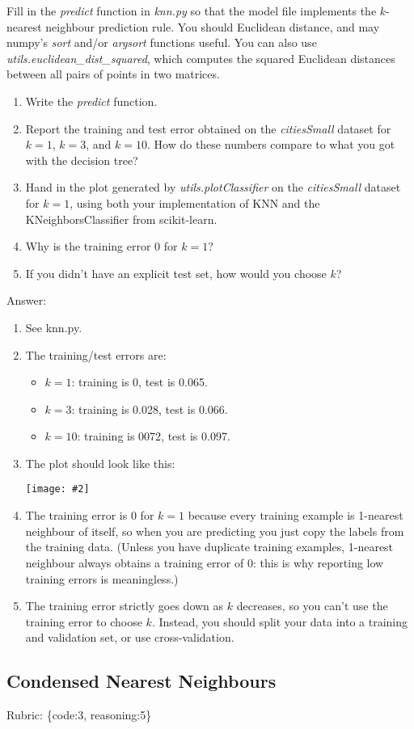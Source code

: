 \documentclass{article}
\def\ans#1{\par\gre{Answer: #1}}
\def\answer#1{\ans{#1}}
\def\rubric#1{\gre{Rubric: \{#1\}}}{}
\def\blu#1{{\color{blu}#1}}
\def\gre#1{{\color{gre}#1}}
\newcommand{\centerfig}[2]{\begin{center}\texttt{[image: \#2]}\end{center}}
\def\items#1{\begin{itemize}#1\end{itemize}}
\def\enum#1{\begin{enumerate}#1\end{enumerate}}
\begin{document}
Fill in the \emph{predict} function in \emph{knn.py} so that the model file implements the $k$-nearest neighbour prediction rule.
You should Euclidean distance, and may numpy's \emph{sort} and/or \emph{argsort} functions useful.
You can also use \emph{utils.euclidean\_dist\_squared}, which computes the squared Euclidean distances between all pairs of points in two matrices.
\blu{
\enum{
\item Write the \emph{predict} function.
\item Report  the training and test error obtained on the \emph{citiesSmall} dataset for $k=1$, $k=3$, and $k=10$. How do these numbers compare to what you got with the decision tree?
\item Hand in the plot generated by \emph{utils.plotClassifier} on the \emph{citiesSmall} dataset for $k=1$, using both your implementation of KNN and the KNeighborsClassifier from scikit-learn.
\item Why is the training error $0$ for $k=1$?
\item If you didn't have an explicit test set, how would you choose $k$?
}}

\answer{
\enum{
\item See knn.py.
\item The training/test errors are:
\items{
\item $k=1$: training is 0, test is 0.065.
\item $k=3$: training is 0.028, test is 0.066.
\item $k=10$: training is 0072, test is 0.097.
}
\item The plot should look like this:
\centerfig{.7}{../figs/q4_1_knnDecisionBoundary.pdf}
\item The training error is $0$ for $k=1$ because every training example is 1-nearest neighbour of itself, so when you are predicting you just copy the labels from the training data. (Unless you have duplicate training examples, 1-nearest neighbour always obtains a training error of 0: this is why reporting low training errors is meaningless.)
\item The training error strictly goes down as $k$ decreases, so you can't use the training error to choose $k$. Instead, you should split your data into a training and validation set, or use cross-validation.
}
}

\subsection{Condensed Nearest Neighbours}
\rubric{code:3, reasoning:5}
\end{document}
